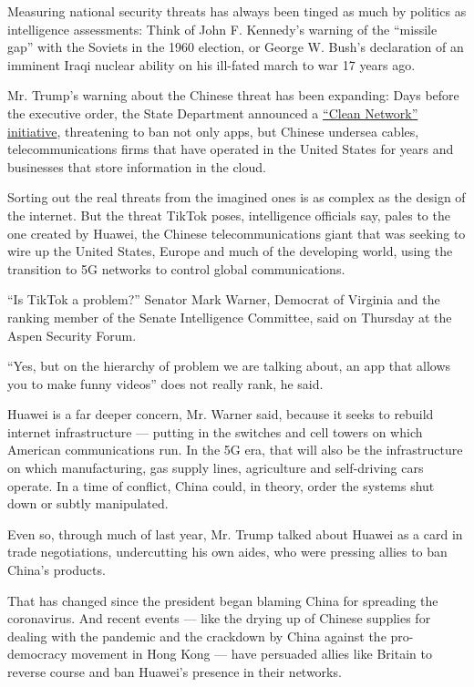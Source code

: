 Measuring national security threats has always been tinged as much by
politics as intelligence assessments: Think of John F. Kennedy's warning
of the ``missile gap'' with the Soviets in the 1960 election, or George
W. Bush's declaration of an imminent Iraqi nuclear ability on his
ill-fated march to war 17 years ago.

Mr. Trump's warning about the Chinese threat has been expanding: Days
before the executive order, the State Department announced a
\href{https://www.state.gov/announcing-the-expansion-of-the-clean-network-to-safeguard-americas-assets/}{``Clean
Network'' initiative}, threatening to ban not only apps, but Chinese
undersea cables, telecommunications firms that have operated in the
United States for years and businesses that store information in the
cloud.

Sorting out the real threats from the imagined ones is as complex as the
design of the internet. But the threat TikTok poses, intelligence
officials say, pales to the one created by Huawei, the Chinese
telecommunications giant that was seeking to wire up the United States,
Europe and much of the developing world, using the transition to 5G
networks to control global communications.

``Is TikTok a problem?'' Senator Mark Warner, Democrat of Virginia and
the ranking member of the Senate Intelligence Committee, said on
Thursday at the Aspen Security Forum.

``Yes, but on the hierarchy of problem we are talking about, an app that
allows you to make funny videos'' does not really rank, he said.

Huawei is a far deeper concern, Mr. Warner said, because it seeks to
rebuild internet infrastructure --- putting in the switches and cell
towers on which American communications run. In the 5G era, that will
also be the infrastructure on which manufacturing, gas supply lines,
agriculture and self-driving cars operate. In a time of conflict, China
could, in theory, order the systems shut down or subtly manipulated.

Even so, through much of last year, Mr. Trump talked about Huawei as a
card in trade negotiations, undercutting his own aides, who were
pressing allies to ban China's products.

That has changed since the president began blaming China for spreading
the coronavirus. And recent events --- like the drying up of Chinese
supplies for dealing with the pandemic and the crackdown by China
against the pro-democracy movement in Hong Kong --- have persuaded
allies like Britain to reverse course and ban Huawei's presence in their
networks.

